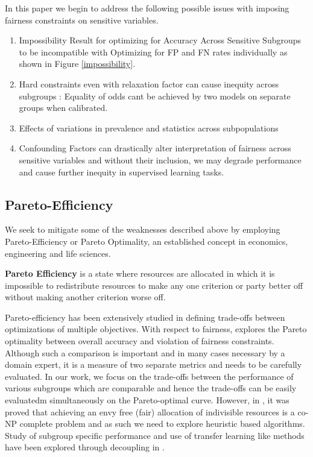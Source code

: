 In this paper we begin to address the following possible issues with imposing fairness constraints on sensitive variables. 
% 
% 
\begin{enumerate}
	
	\item Impossibility Result for optimizing for Accuracy Across Sensitive Subgroups to be incompatible with Optimizing for FP and FN rates individually as shown in Figure \ref{impossibility}.
	\item Hard constraints even with relaxation factor can cause inequity across subgroups : Equality of odds cant be achieved by two models on separate groups when calibrated. 
    \item Effects of variations in prevalence and statistics across subpopulations 
    \item Confounding Factors can drastically alter interpretation of fairness across sensitive variables and without their inclusion, we may degrade performance and cause further inequity in supervised learning tasks.
\end{enumerate}

\subsection{Pareto-Efficiency}
	We seek to mitigate some of the weaknesses described above by employing Pareto-Efficiency or Pareto Optimality, an established concept in economics, engineering and life sciences.
    
\begin{definition}
\textbf{Pareto Efficiency} is a state where resources are allocated in which it is impossible to redistribute resources to make any one criterion or party better off without making another criterion worse off. 
\end{definition}

Pareto-efficiency has been extensively studied in defining trade-offs between optimizations of multiple objectives. With respect to fairness, \cite{paretoTradeoff} explores the Pareto optimality between overall accuracy and violation of fairness constraints. Although such a comparison is important and in many cases necessary by a domain expert, it is a measure of two separate metrics and needs to be carefully evaluated. In our work, we focus on the trade-offs between the performance of various subgroups which are comparable and hence the trade-offs can be easily evaluatedm simultaneously on the Pareto-optimal curve. However, in \cite{LiptonEnvyFree}, it was proved that achieving an envy free (fair) allocation of indivisible resources is a co-NP complete problem and as such we need to explore heuristic based algorithms. Study of subgroup specific performance and use of transfer learning like methods have been explored through decoupling in \cite{pmlr-v81-dwork18a}.

